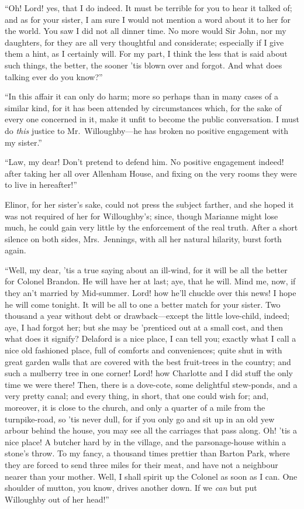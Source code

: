\documentclass{article}
\begin{document}
``Oh! Lord! yes, that I do indeed.  It must be terrible
for you to hear it talked of; and as for your sister,
I am sure I would not mention a word about it to her
for the world.  You saw I did not all dinner time.
No more would Sir John, nor my daughters, for they are
all very thoughtful and considerate; especially if I
give them a hint, as I certainly will.  For my part,
I think the less that is said about such things, the better,
the sooner 'tis blown over and forgot.  And what does
talking ever do you know?''

``In this affair it can only do harm; more so
perhaps than in many cases of a similar kind, for it
has been attended by circumstances which, for the sake
of every one concerned in it, make it unfit to become
the public conversation.  I must do \emph{this} justice to
Mr.\ Willoughby---he has broken no positive engagement
with my sister.''

``Law, my dear!  Don't pretend to defend him.
No positive engagement indeed! after taking her all
over Allenham House, and fixing on the very rooms they
were to live in hereafter!''

Elinor, for her sister's sake, could not press the
subject farther, and she hoped it was not required of her
for Willoughby's; since, though Marianne might lose much,
he could gain very little by the enforcement of the real truth.
After a short silence on both sides, Mrs.\ Jennings,
with all her natural hilarity, burst forth again.

``Well, my dear, 'tis a true saying about an ill-wind,
for it will be all the better for Colonel Brandon.
He will have her at last; aye, that he will.  Mind me,
now, if they an't married by Mid-summer.  Lord! how he'll
chuckle over this news!  I hope he will come tonight.
It will be all to one a better match for your sister.
Two thousand a year without debt or drawback---except
the little love-child, indeed; aye, I had forgot her;
but she may be 'prenticed out at a small cost, and then
what does it signify?  Delaford is a nice place, I can
tell you; exactly what I call a nice old fashioned place,
full of comforts and conveniences; quite shut in with great
garden walls that are covered with the best fruit-trees
in the country; and such a mulberry tree in one corner!
Lord! how Charlotte and I did stuff the only time we
were there!  Then, there is a dove-cote, some delightful
stew-ponds, and a very pretty canal; and every thing,
in short, that one could wish for; and, moreover, it is
close to the church, and only a quarter of a mile from
the turnpike-road, so 'tis never dull, for if you only
go and sit up in an old yew arbour behind the house,
you may see all the carriages that pass along.
Oh! 'tis a nice place!  A butcher hard by in the village,
and the parsonage-house within a stone's throw.
To my fancy, a thousand times prettier than Barton Park,
where they are forced to send three miles for their meat,
and have not a neighbour nearer than your mother.
Well, I shall spirit up the Colonel as soon as I can.
One shoulder of mutton, you know, drives another down.
If we \emph{can} but put Willoughby out of her head!''
\end{document}
